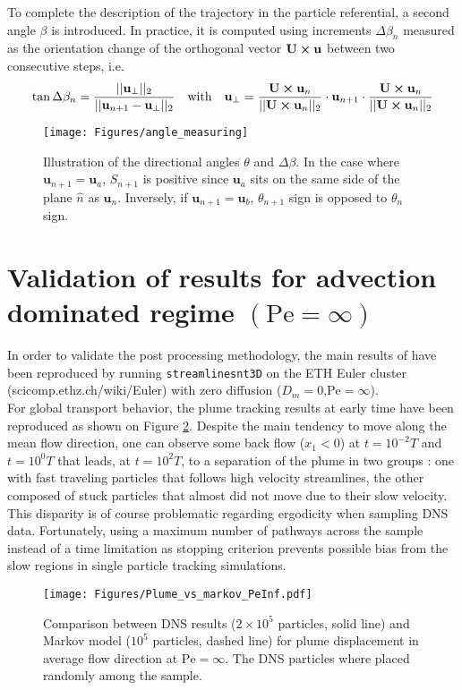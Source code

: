 To complete the description of the trajectory in the particle referential, a second angle $\beta$ is introduced. In practice, it is computed using increments $\Delta \beta_n$ measured as the orientation change of the orthogonal vector $\textbf{U}\cross \textbf{u}$ between two consecutive steps, i.e.
\begin{equation}
\tan\Delta\beta_n = \frac{||\textbf{u}_\perp||_2}{||\textbf{u}_{n+1}-\textbf{u}_\perp||_2}
\quad\textrm{with}\quad
\textbf{u}_\perp =\frac{\textbf{U}\cross\textbf{u}_{n}}{||\textbf{U}\cross\textbf{u}_n||_2}\cdot \textbf{u}_{n+1}\cdot\frac{\textbf{U}\cross\textbf{u}_{n}}{||\textbf{U}\cross\textbf{u}_n||_2}
\end{equation}

\begin{figure}
	\centering
	\texttt{[image: Figures/angle\_measuring]}
	\caption{Illustration of the directional angles $\theta$ and $\Delta \beta$. In the case where $\textbf{u}_{n+1} = \textbf{u}_a$, $S_{n+1}$ is positive since $\textbf{u}_a$ sits on the same side of the plane $\hat{n}$ as $\textbf{u}_n$. Inversely, if $\textbf{u}_{n+1} = \textbf{u}_b$, $\theta_{n+1}$ sign is opposed to $\theta_n$ sign. }
	\label{fig:anglemeasuring}
\end{figure}


\section{Validation of \cite{Meyer2016} results for advection dominated regime $(\mathrm{Pe}=\infty)$}
In order to validate the post processing methodology, the main results of \cite{Meyer2016} have been reproduced by running \texttt{streamlinesnt3D} on the ETH Euler cluster (scicomp.ethz.ch/wiki/Euler) with zero diffusion ($D_m=0$,$\mathrm{Pe}=\infty$).\\ 

For global transport behavior, the plume tracking results at early time have been reproduced as shown on Figure \ref{fig:plume_peinf}. 
Despite the main tendency to move along the mean flow direction, one can observe some back flow ($x_1<0$) at $t=10^{-2}T$ and $t=10^0T$ that leads, at $t=10^2T$, to a separation of the plume in two groups : one with fast traveling particles that follows high velocity streamlines, the other composed of stuck particles that almost did not move due to their slow velocity.
This disparity is of course problematic regarding ergodicity when sampling DNS data.
Fortunately, using a maximum number of pathways across the sample instead of a time limitation as stopping criterion prevents possible bias from the slow regions in single particle tracking simulations.
\begin{figure}[h!]
	\centering
	\texttt{[image: Figures/Plume\_vs\_markov\_PeInf.pdf]}
	\caption{Comparison between DNS results ($2\times 10^5$ particles, solid line) and Markov model ($10^5$ particles, dashed line) for plume displacement in average flow direction at $\mathrm{Pe}=\infty$. The DNS particles where placed randomly among the sample.}
	\label{fig:plume_peinf}
\end{figure}

